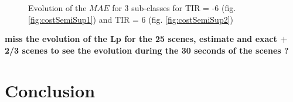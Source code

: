 \documentclass[twocolumn,a4paper,10pt]{article}
\begin{document}
\begin{figure}
    \centering
    \caption{Evolution of the $MAE$ for 3 sub-classes for TIR = -6 (fig.  \ref{fig:costSemiSup1}) and TIR = 6 (fig. \ref{fig:costSemiSup2})}
    \label{fig:costSemiSup12}
\end{figure}

\textbf{miss the evolution of the Lp for the 25 scenes, estimate and exact + 2/3 scenes to see the evolution during the 30 seconds of the scenes ?}

\section{Conclusion}
\footnotesize


\end{document}

